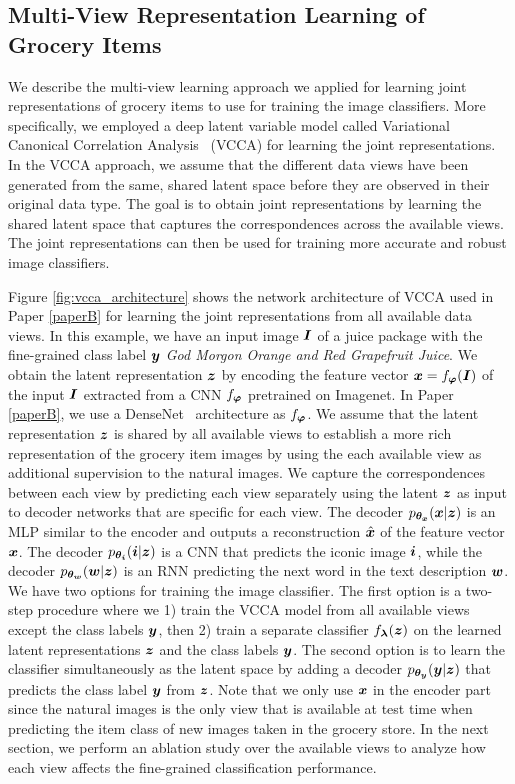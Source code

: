 \subsection{Multi-View Representation Learning of Grocery Items}

We describe the multi-view learning approach we applied for learning joint representations of grocery items to use for training the image classifiers. More specifically, we employed a deep latent variable model called Variational Canonical Correlation Analysis~\cite{wang2016deep} (VCCA) for learning the joint representations. In the VCCA approach, we assume that the different data views have been generated from the same, shared latent space before they are observed in their original data type. The goal is to obtain joint representations by learning the shared latent space that captures the correspondences across the available views. The joint representations can then be used for training more accurate and robust image classifiers.

Figure \ref{fig:vcca_architecture} shows the network architecture of VCCA %
used in Paper \ref{paperB} for learning the joint representations from all available data views. In this example, we have an input image ${\bm{I}}$ of a juice package with the fine-grained class label ${\bm{y}}$ \textit{God Morgon Orange and Red Grapefruit Juice}. We obtain the latent representation ${\bm{z}}$ by encoding the feature vector ${\bm{x}} = f_{{\bm{\varphi}}}({\bm{I}})$ of the input ${\bm{I}}$ extracted from a CNN $f_{{\bm{\varphi}}}$ pretrained on Imagenet. In Paper \ref{paperB}, we use a DenseNet~\cite{huang2017densely} architecture as $f_{{\bm{\varphi}}}$. 
We assume that the latent representation ${\bm{z}}$ is shared by all available views to establish a more rich representation of the grocery item images by using the each available view as additional supervision to the natural images. 
We capture the correspondences between each view by predicting each view separately using the latent ${\bm{z}}$ as input to decoder networks that are specific for each view. 
The decoder $p_{{\bm{\theta}}_{{\bm{x}}}}({\bm{x}} | {\bm{z}})$ is an MLP similar to the encoder and outputs a reconstruction $\hat{{\bm{x}}}$ of the feature vector ${\bm{x}}$. The decoder $p_{{\bm{\theta}}_{{\bm{i}}}}({\bm{i}} | {\bm{z}})$ is a CNN that predicts the iconic image ${\bm{i}}$, while the decoder $p_{{\bm{\theta}}_{{\bm{w}}}}({\bm{w}} | {\bm{z}})$ is an RNN predicting the next word in the text description ${\bm{w}}$. 
We have two options for training the image classifier. The first option is a two-step procedure where we 1) train the VCCA model from all available views except the class labels ${\bm{y}}$, then 2) train a separate classifier $f_{{\bm{\lambda}}}({\bm{z}})$ on the learned latent representations ${\bm{z}}$ and the class labels ${\bm{y}}$. The second option is to learn the classifier simultaneously as the latent space by adding a decoder $p_{{\bm{\theta}}_{{\bm{y}}}}({\bm{y}} | {\bm{z}})$ that predicts the class label ${\bm{y}}$ from ${\bm{z}}$.
Note that we only use ${\bm{x}}$ in the encoder part since the natural images is the only view that is available at test time when predicting the item class of new images taken in the grocery store. In the next section, we perform an ablation study over the available views to analyze how each view affects the fine-grained classification performance.  

